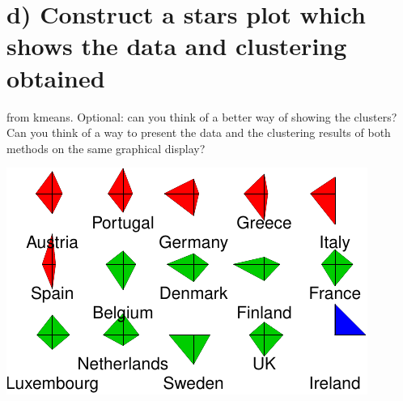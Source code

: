 \documentclass[]{article}
\newenvironment{Shaded}{\begin{snugshade}}{\end{snugshade}}
\newcommand{\DataTypeTok}[1]{\textcolor[rgb]{0.13,0.29,0.53}{#1}}
\newcommand{\DecValTok}[1]{\textcolor[rgb]{0.00,0.00,0.81}{#1}}
\newcommand{\KeywordTok}[1]{\textcolor[rgb]{0.13,0.29,0.53}{\textbf{#1}}}
\newcommand{\NormalTok}[1]{#1}
\newcommand{\OperatorTok}[1]{\textcolor[rgb]{0.81,0.36,0.00}{\textbf{#1}}}
\newcommand{\StringTok}[1]{\textcolor[rgb]{0.31,0.60,0.02}{#1}}
\begin{document}
\hypertarget{d-construct-a-stars-plot-which-shows-the-data-and-clustering-obtained}{%
\section{d) Construct a stars plot which shows the data and clustering
obtained}\label{d-construct-a-stars-plot-which-shows-the-data-and-clustering-obtained}}

from kmeans. Optional: can you think of a better way of showing the
clusters? Can you think of a way to present the data and the clustering
results of both methods on the same graphical display?

\begin{Shaded}
\end{Shaded}

\begin{center}\includegraphics{sol_A1_files/figure-latex/unnamed-chunk-9-1} \end{center}
\end{document}
